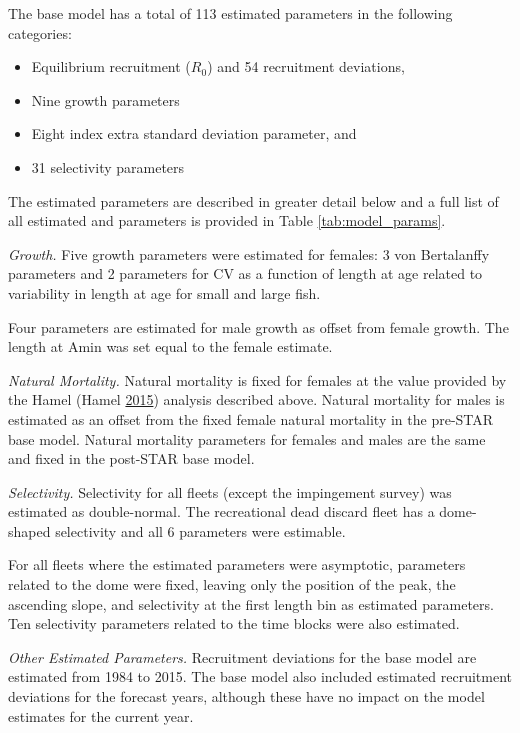\documentclass[12pt,]{article}
\begin{document}
The base model has a total of 113 estimated parameters in the following
categories:

\begin{itemize}
  \item Equilibrium recruitment ($R_0$) and 54 recruitment deviations,
  \item Nine growth parameters
  \item Eight index extra standard deviation parameter, and
  \item 31 selectivity parameters
\end{itemize}

The estimated parameters are described in greater detail below and a
full list of all estimated and parameters is provided in Table
\ref{tab:model_params}.

\emph{Growth.} Five growth parameters were estimated for females: 3 von
Bertalanffy parameters and 2 parameters for CV as a function of length
at age related to variability in length at age for small and large fish.

Four parameters are estimated for male growth as offset from female
growth. The length at Amin was set equal to the female estimate.

\emph{Natural Mortality.} Natural mortality is fixed for females at the
value provided by the Hamel (Hamel
\protect\hyperlink{ref-Hamel2015}{2015}) analysis described above.
Natural mortality for males is estimated as an offset from the fixed
female natural mortality in the pre-STAR base model. Natural mortality
parameters for females and males are the same and fixed in the post-STAR
base model.

\emph{Selectivity.} Selectivity for all fleets (except the impingement
survey) was estimated as double-normal. The recreational dead discard
fleet has a dome-shaped selectivity and all 6 parameters were estimable.

For all fleets where the estimated parameters were asymptotic,
parameters related to the dome were fixed, leaving only the position of
the peak, the ascending slope, and selectivity at the first length bin
as estimated parameters. Ten selectivity parameters related to the time
blocks were also estimated.

\emph{Other Estimated Parameters.} Recruitment deviations for the base
model are estimated from 1984 to 2015. The base model also included
estimated recruitment deviations for the forecast years, although these
have no impact on the model estimates for the current year.
\end{document}
